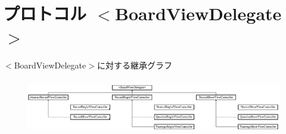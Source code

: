 \hypertarget{protocol_board_view_delegate-p}{
\section{プロトコル $<$BoardViewDelegate$>$}
\label{protocol_board_view_delegate-p}
}
$<$BoardViewDelegate$>$に対する継承グラフ\begin{figure}[H]
\begin{center}
\leavevmode
\includegraphics[height=2.430556cm]{protocol_board_view_delegate-p}
\end{center}
\end{figure}
